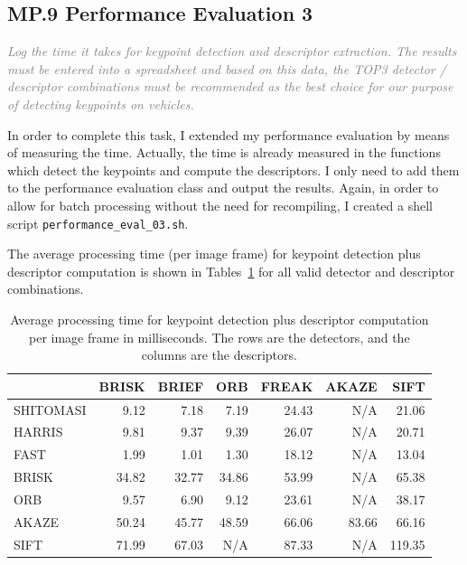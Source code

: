 \documentclass[a4paper]{scrartcl}
\begin{document}
\subsection*{MP.9 Performance Evaluation 3}
\textcolor{gray}{\textit{Log the time it takes for keypoint detection and descriptor extraction. The results must be entered into a spreadsheet and based on this data, the TOP3 detector / descriptor combinations must be recommended as the best choice for our purpose of detecting keypoints on vehicles.}}

In order to complete this task, I extended my performance evaluation by means of measuring the time.
Actually, the time is already measured in the functions which detect the keypoints and compute
the descriptors. I only need to add them to the performance evaluation class and output the results.
Again, in order to allow for batch processing without the need for recompiling,
I created a shell script \texttt{performance\_eval\_03.sh}.

The average processing time (per image frame) for keypoint detection plus descriptor computation
is shown in Tables~\ref{tab:performance_3}
for all valid detector and descriptor combinations.

\begin{table}
	\caption{Average processing time for keypoint detection plus descriptor computation
		per image frame in milliseconds.
		The rows are the detectors, and the columns are the descriptors.}
	\label{tab:performance_3}
	\begin{tabular}{l||r|r|r|r|r|r}
		 			& BRISK & BRIEF & ORB & FREAK 	& AKAZE & SIFT		\\
		\hline \hline
		SHITOMASI 	& 9.12	& 7.18	& 7.19	& 24.43	& N/A 	& 21.06 	\\
		HARRIS 		& 9.81	& 9.37	& 9.39	& 26.07	& N/A 	& 20.71 	\\
		FAST 		& 1.99	& 1.01	& 1.30	& 18.12	& N/A 	& 13.04 	\\
		BRISK 		& 34.82	& 32.77	& 34.86	& 53.99	& N/A 	& 65.38 	\\
		ORB 		& 9.57	& 6.90	& 9.12	& 23.61	& N/A 	& 38.17 	\\
		AKAZE 		& 50.24	& 45.77	& 48.59	& 66.06	& 83.66	& 66.16 	\\
		SIFT 		& 71.99	& 67.03	& N/A 	& 87.33	& N/A 	& 119.35 	\\
		\hline
	\end{tabular}
\end{table}
\end{document}
